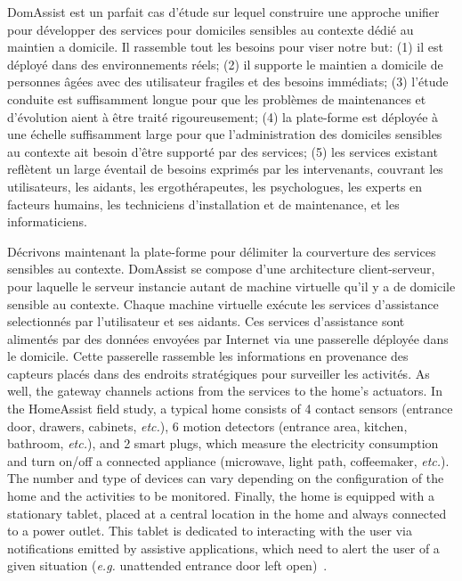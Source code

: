 DomAssist est un parfait cas d'étude sur lequel construire une approche unifier pour développer des services pour domiciles sensibles au contexte dédié au maintien a domicile. Il rassemble tout les besoins pour viser notre but: (1) il est déployé dans des environnements réels; (2) il supporte le maintien a domicile de personnes âgées avec des utilisateur fragiles et des besoins immédiats; (3) l'étude conduite est suffisamment longue pour que les problèmes de maintenances et d'évolution aient à être traité rigoureusement; (4) la plate-forme est déployée à une échelle suffisamment large pour que l'administration des domiciles sensibles au contexte ait besoin d'être supporté par des services; (5) les services existant reflètent un large éventail de besoins exprimés par les intervenants, couvrant les utilisateurs, les aidants, les ergothérapeutes, les psychologues, les experts en facteurs humains, les techniciens d'installation et de maintenance, et les informaticiens.

Décrivons maintenant la plate-forme pour délimiter la courverture des services sensibles au contexte. DomAssist se compose d'une architecture client-serveur, pour laquelle le serveur instancie autant de machine virtuelle qu'il y a de domicile sensible au contexte. Chaque machine virtuelle exécute les services d'assistance selectionnés par l'utilisateur et ses aidants. Ces services d'assistance sont alimentés par des données envoyées par Internet via une passerelle déployée dans le domicile. Cette passerelle rassemble les informations en provenance des capteurs placés dans des endroits stratégiques pour surveiller les activités. 
 As well, the gateway channels actions from the services to the home's actuators. In the HomeAssist field study, a typical home consists of 4 contact sensors (entrance door, drawers, cabinets, {\em etc.}), 6 motion detectors (entrance area, kitchen, bathroom, {\em etc.}), and 2 smart plugs, which measure the electricity consumption and turn on/off a connected appliance (microwave, light path, coffeemaker, {\em etc.}). The number and type of devices can vary depending on the configuration of the home and the activities to be monitored. Finally, the home is equipped with a stationary tablet, placed at a central location in the home and always connected to a power outlet. This tablet is dedicated to interacting with the user via notifications emitted by assistive applications, which need to alert the user of a given situation ({\em e.g.} unattended entrance door left open)~\cite{consel2015unifying}.


